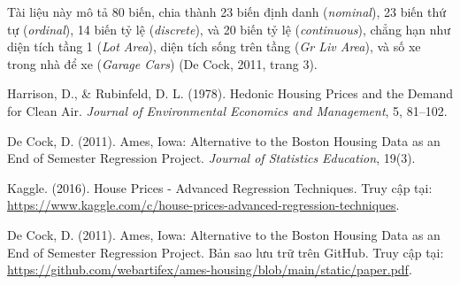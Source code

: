 \documentclass{article}
\begin{document}
Tài liệu này mô tả 80 biến, chia thành 23 biến định danh (\textit{nominal}), 23 biến thứ tự (\textit{ordinal}), 14 biến tỷ lệ (\textit{discrete}), và 20 biến tỷ lệ (\textit{continuous}), chẳng hạn như diện tích tầng 1 (\textit{Lot Area}), diện tích sống trên tầng (\textit{Gr Liv Area}), và số xe trong nhà để xe (\textit{Garage Cars}) (De Cock, 2011, trang 3).

\begin{thebibliography}{9}

Harrison, D., \& Rubinfeld, D. L. (1978). Hedonic Housing Prices and the Demand for Clean Air. \textit{Journal of Environmental Economics and Management}, 5, 81--102.

De Cock, D. (2011). Ames, Iowa: Alternative to the Boston Housing Data as an End of Semester Regression Project. \textit{Journal of Statistics Education}, 19(3).

Kaggle. (2016). House Prices - Advanced Regression Techniques. Truy cập tại: \url{https://www.kaggle.com/c/house-prices-advanced-regression-techniques}.

De Cock, D. (2011). Ames, Iowa: Alternative to the Boston Housing Data as an End of Semester Regression Project. Bản sao lưu trữ trên GitHub. Truy cập tại: \url{https://github.com/webartifex/ames-housing/blob/main/static/paper.pdf}.

\end{thebibliography}
\end{document}

